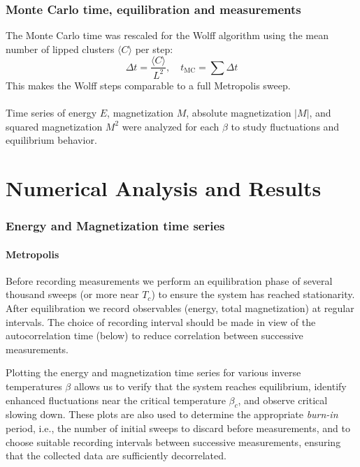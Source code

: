 \documentclass{article}
\begin{document}
\subsubsection{Monte Carlo time, equilibration and measurements}
The Monte Carlo time was rescaled for the Wolff algorithm using the mean number of lipped clusters $\langle C \rangle$ per step:
\begin{equation}
    \Delta t = \frac{\langle C\rangle}{L^2}, \quad
    t_\text{MC} = \sum \Delta t
\end{equation}
This makes the Wolff steps comparable to a full Metropolis sweep.
\\
\\
Time series of energy $E$, magnetization $M$, absolute magnetization $|M|$, and squared magnetization $M^2$ were analyzed for each $\beta$ to study fluctuations and equilibrium behavior.

\section{Numerical Analysis and Results}

\subsubsection{Energy and Magnetization time series}
\paragraph{Metropolis}
Before recording measurements we perform an equilibration phase of several
thousand sweeps (or more near \(T_c\)) to ensure the system has reached
stationarity. After equilibration we record observables (energy, total
magnetization) at regular intervals. The choice of recording interval should
be made in view of the autocorrelation time (below) to reduce correlation
between successive measurements.


Plotting the energy and magnetization time series for various inverse temperatures $\beta$ allows us to verify that the system reaches equilibrium, identify enhanced fluctuations near the critical temperature $\beta_c$, and observe critical slowing down. These plots are also used to determine the appropriate \emph{burn-in} period, i.e., the number of initial sweeps to discard before measurements, and to choose suitable recording intervals between successive measurements, ensuring that the collected data are sufficiently decorrelated.
\end{document}
